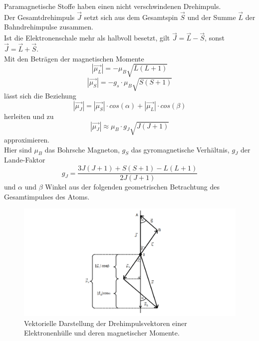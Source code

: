 Paramagnetische Stoffe haben einen nicht verschwindenen Drehimpuls.\\
Der Gesamtdrehimpuls $\vec{J}$ setzt sich aus dem Gesamtspin $\vec{S}$ und der Summe $\vec{L}$ der Bahndrehimpulse zusammen.\\
Ist die Elektronenschale mehr als halbvoll besetzt, gilt $\vec{J} = \vec{L} - \vec{S}$, sonst $\vec{J} = \vec{L} + \vec{S}$.\\

Mit den Beträgen der magnetischen Momente 
\begin{equation}
    |\vec{\mu_L}| = -\mu_B \sqrt{L(L+1)}
\end{equation}
\begin{equation}
    |\vec{\mu_S}| = - g_s \cdot \mu_B \sqrt{S(S+1)}
\end{equation}
lässt sich die Beziehung 
\begin{equation}
    |\vec{\mu_J}| = |\vec{\mu_S}| \cdot cos(\alpha) + |\vec{\mu_L}| \cdot cos(\beta)
\end{equation}
herleiten und zu 
\begin{equation}
    |\vec{\mu_J}| \approx \mu_B \cdot g_J \sqrt{J(J+1)}
\end{equation}
approximieren.\\
Hier sind $\mu_B$ das Bohrsche Magneton, $g_S$ das gyromagnetische 
Verhältnis, $g_J$ der Lande-Faktor
\begin{equation}
    g_J = \frac{3J(J+1) + S(S+1) - L(L+1)}{2J(J+1)}
\end{equation}
und $\alpha$ und $\beta$ Winkel aus der folgenden geometrischen Betrachtung des Gesamtimpulses
des Atoms.\\
\begin{figure}
    \centering
    \includegraphics[width=\textwidth]{content/vec_theo.png}
    \caption{Vektorielle Darstellung der Drehimpulsvektoren einer Elektronenhülle und deren magnetischer Momente. \cite{sample}}
    \label{fig:vektoriell}
\end{figure}

